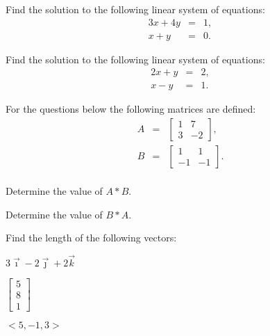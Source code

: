 

\begin{problem}
\item Find the solution to the following linear system of equations:
  \begin{eqnarray*}
    3x + 4y & = & 1, \\
    x + y   & = & 0.
  \end{eqnarray*}
  \vfill

\item Find the solution to the following linear system of equations:
  \begin{eqnarray*}
    2x + y & = &  2, \\
    x - y  & = &  1.
  \end{eqnarray*}
  \vfill

\end{problem}


  \begin{problem}
  \item For the questions below the following matrices are defined:
    \begin{eqnarray*}
      A & = & 
      \left[
        \begin{array}{rr}
          1 &  7 \\ 
          3 & -2
        \end{array}
      \right], \\
      B & = & 
      \left[
        \begin{array}{rr}
          1 &  1 \\
          -1 & -1
        \end{array}
      \right]. \\
    \end{eqnarray*}

    \begin{subproblem}
    \item Determine the value of  $A*B$.

    \vfill

  \item Determine the value of $B*A$.
    \vfill

  \end{subproblem}

    \clearpage
  \item Find the length of the following vectors:

    \begin{subproblem}
      \item $3\vec{\imath} - 2\vec{\jmath} + 2\vec{k}$
        \vfill
      \item $\left[\begin{array}{r} 5 \\ 8 \\ 1 \end{array}\right]$
        \vfill
      \item $<5,-1,3>$
        \vfill
    \end{subproblem}

  \end{problem}


